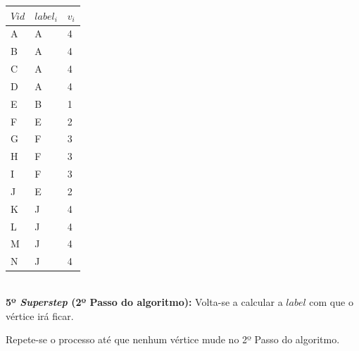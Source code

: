 \documentclass[a4paper,10pt]{report}
\begin{document}
\begin{tabular}{| l | l | l |}
    \hline
    $Vid$ & $label_i$ & $v_i$ \\ \hline
    A & A & 4 \\ \hline
    B & A & 4 \\ \hline
    C & A & 4 \\ \hline
    D & A & 4 \\ \hline
    E & B & 1 \\ \hline
    F & E & 2 \\ \hline
    G & F & 3 \\ \hline
    H & F & 3 \\ \hline
    I & F & 3 \\ \hline
    J & E & 2 \\ \hline
    K & J & 4 \\ \hline
    L & J & 4 \\ \hline
    M & J & 4 \\ \hline
    N & J & 4 \\ \hline
\end{tabular}
\\[0.25cm] 
{\bf 5º \textit{Superstep} (2º Passo do algoritmo):}
Volta-se a calcular a $label$ com que o vértice irá ficar.

Repete-se o processo até que nenhum vértice mude no 2º Passo do algoritmo.
\end{document}
